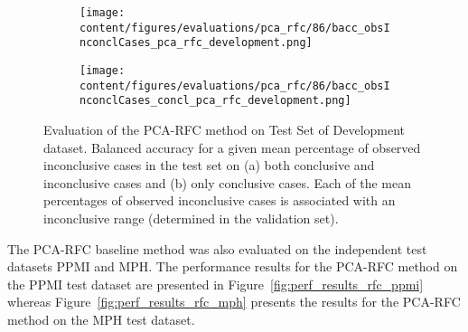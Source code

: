 \begin{figure}[ht]
  \begin{subfigure}{0.9\textwidth}
    \centering
    \texttt{[image: content/figures/evaluations/pca\_rfc/86/bacc\_obsInconclCases\_pca\_rfc\_development.png]}
    \subcaption{}
    \label{fig:bacc_obsInconclCases_pca_rfc_development}
  \end{subfigure}
  \hfill
  \begin{subfigure}{0.9\textwidth}
    \centering
    \texttt{[image: content/figures/evaluations/pca\_rfc/86/bacc\_obsInconclCases\_concl\_pca\_rfc\_development.png]}
    \subcaption{}
    \label{fig:bacc_obsInconclCases_concl_pca_rfc_development}
  \end{subfigure}

  \caption{Evaluation of the PCA-RFC method on Test Set of Development dataset.
  Balanced accuracy for a given mean percentage of observed inconclusive cases in the test set on 
  (a) both conclusive and inconclusive cases and (b) only conclusive cases. 
  Each of the mean percentages of observed inconclusive cases is associated with an inconclusive range (determined in the validation set). }
  \label{fig:bacc_obsInconclCases_pca_rfc_development_full}
\end{figure}



The PCA-RFC baseline method was also evaluated on the independent test datasets PPMI and MPH.
The performance results for the PCA-RFC method on the PPMI test dataset are presented in Figure~\ref{fig:perf_results_rfc_ppmi} 
whereas Figure~\ref{fig:perf_results_rfc_mph} presents the results for the PCA-RFC method on the MPH test dataset.



